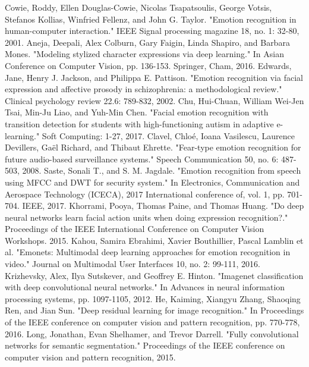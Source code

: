 \documentclass[conference]{IEEEtran}
\begin{document}
\begin{thebibliography}{1}
\small
{}
Cowie, Roddy, Ellen Douglas-Cowie, Nicolas Tsapatsoulis, George Votsis, Stefanos Kollias, Winfried Fellenz, and John G. Taylor. "Emotion recognition in human-computer interaction." IEEE Signal processing magazine 18, no. 1: 32-80, 2001.
Aneja, Deepali, Alex Colburn, Gary Faigin, Linda Shapiro, and Barbara Mones. "Modeling stylized character expressions via deep learning." In Asian Conference on Computer Vision, pp. 136-153. Springer, Cham, 2016.
Edwards, Jane, Henry J. Jackson, and Philippa E. Pattison. "Emotion recognition via facial expression and affective prosody in schizophrenia: a methodological review." Clinical psychology review 22.6: 789-832, 2002.
Chu, Hui-Chuan, William Wei-Jen Tsai, Min-Ju Liao, and Yuh-Min Chen. "Facial emotion recognition with transition detection for students with high-functioning autism in adaptive e-learning." Soft Computing: 1-27, 2017.
Clavel, Chloé, Ioana Vasilescu, Laurence Devillers, Gaël Richard, and Thibaut Ehrette. "Fear-type emotion recognition for future audio-based surveillance systems." Speech Communication 50, no. 6: 487-503, 2008.
Saste, Sonali T., and S. M. Jagdale. "Emotion recognition from speech using MFCC and DWT for security system." In Electronics, Communication and Aerospace Technology (ICECA), 2017 International conference of, vol. 1, pp. 701-704. IEEE, 2017.
Khorrami, Pooya, Thomas Paine, and Thomas Huang. "Do deep neural networks learn facial action units when doing expression recognition?." Proceedings of the IEEE International Conference on Computer Vision Workshops. 2015.
Kahou, Samira Ebrahimi, Xavier Bouthillier, Pascal Lamblin et al. "Emonets: Multimodal deep learning approaches for emotion recognition in video." Journal on Multimodal User Interfaces 10, no. 2: 99-111, 2016.
Krizhevsky, Alex, Ilya Sutskever, and Geoffrey E. Hinton. "Imagenet classification with deep convolutional neural networks." In Advances in neural information processing systems, pp. 1097-1105, 2012.
He, Kaiming, Xiangyu Zhang, Shaoqing Ren, and Jian Sun. "Deep residual learning for image recognition." In Proceedings of the IEEE conference on computer vision and pattern recognition, pp. 770-778, 2016.
Long, Jonathan, Evan Shelhamer, and Trevor Darrell. "Fully convolutional networks for semantic segmentation." Proceedings of the IEEE conference on computer vision and pattern recognition, 2015.

\end{thebibliography}
\end{document}
